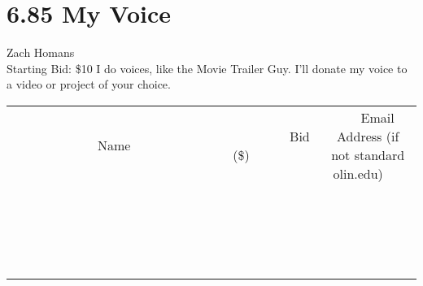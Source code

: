 \documentclass[11pt]{article}
\begin{document}
\section*{6.85 My Voice}
Zach Homans
\\
Starting Bid: \$10
\newline
I do voices, like the Movie Trailer Guy. I'll donate my voice to a video or project of your choice.
\\[3ex]
\begin{tabular}{c c c}
~~~~~~~~~~~~~Name~~~~~~~~~~~~~ & ~~~~~~~~~Bid (\$)~~~~~~~~~  & ~~~Email Address (if not standard olin.edu)~~~\\
 & & \\
\hline
 & & \\
\hline
 & & \\
\hline
 & & \\
\hline
 & & \\
\hline
 & & \\
\hline
 & & \\
\hline
 & & \\
\hline
 & & \\
\hline
 & & \\
\hline
 & & \\
\hline
 & & \\
\hline
 & & \\
\hline
 & & \\
\hline
 & & \\
\hline
 & & \\
\hline
 & & \\
\hline
 & & \\
\hline
 & & \\
\hline
\end{tabular}
\newpage
\end{document}
